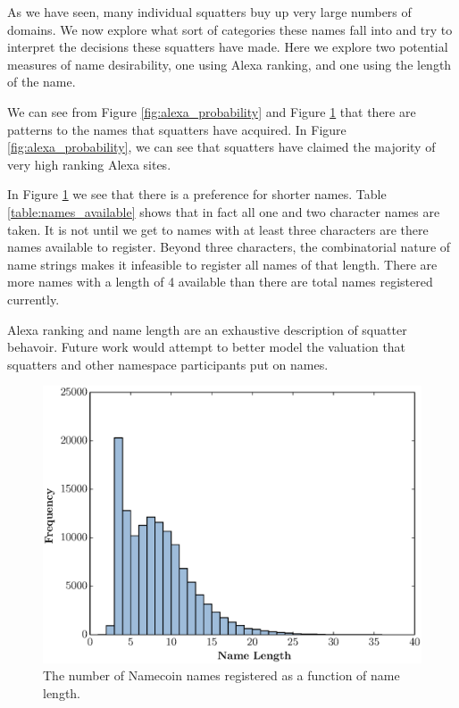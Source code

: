 As we have seen, many individual squatters buy up very large numbers of domains. We now explore what sort of categories these names fall into and try to interpret the decisions these squatters have made. Here we explore two potential measures of name desirability, one using Alexa ranking, and one using the length of the name.

We can see from Figure \ref{fig:alexa_probability} and Figure \ref{fig:name_length_histogram} that there are patterns to the names that squatters have acquired. In Figure \ref{fig:alexa_probability}, we can see that squatters have claimed the majority of very high ranking Alexa sites.

In Figure \ref{fig:name_length_histogram} we see that there is a preference for shorter names. Table \ref{table:names_available} shows that in fact all one and two character names are taken. It is not until we get to names with at least three characters are there names available to register. Beyond three characters, the combinatorial nature of name strings makes it infeasible to register all names of that length. There are more names with a length of 4 available than there are total names registered currently.

Alexa ranking and name length are an exhaustive description of squatter behavoir. Future work would attempt to better model the valuation that squatters and other namespace participants put on names.


\begin{figure}
  \centering
  \includegraphics[width=\columnwidth]{figures/name_length_histogram}
  \caption{The number of Namecoin names registered as a function of name length.}
  \label{fig:name_length_histogram}
\end{figure}

